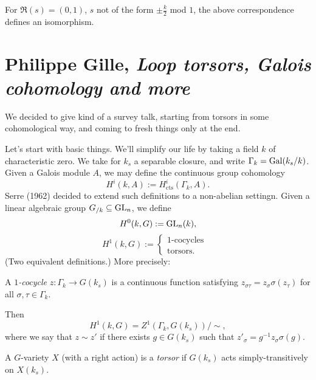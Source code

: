 \documentclass[reqno]{amsart} 
\numberwithin{theorem}{section}
\numberwithin{equation}{section}
\begin{document}
\begin{theorem}[BCP]
  For $\Re(s) =(0, 1)$, $s$ not of the form $\pm \tfrac{k}{2}$ mod $1$, the above correspondence defines an isomorphism.
\end{theorem}

\section{Philippe Gille, \emph{Loop torsors, Galois cohomology and more}}

We decided to give kind of a survey talk, starting from torsors in some cohomological way, and coming to fresh things only at the end.

Let's start with basic things.  We'll simplify our life by taking a field $k$ of characteristic zero.  We take for $k_s$ a separable closure, and write $\Gamma_k = \operatorname{Gal}(k_s / k)$.  Given a Galois module $A$, we may define the continuous group cohomology
\begin{equation*}
  H^i(k, A) := H^i_{\mathrm{cts}}(\Gamma_k, A).
\end{equation*}
Serre (1962) decided to extend such definitions to a non-abelian settingn.  Given a linear algebraic group $G _{/k} \subseteq \operatorname{GL}_n$, we define
\begin{equation*}
  H^0(k, G) := \operatorname{GL}_n(k),
\end{equation*}
\begin{equation*}
  H^1(k, G) :=
  \begin{cases}
    \text{$1$-cocycles}    &  \\
    \text{torsors}.                           & 
  \end{cases}
\end{equation*}
(Two equivalent definitions.)  More precisely:
\begin{definition}
  A $1$\emph{-cocycle} $z : \Gamma_k \rightarrow G(k_s)$ is a continuous function satisfying $z_{\sigma \tau} = z_\sigma \sigma(z_\tau)$ for all $\sigma, \tau \in \Gamma_k$.
\end{definition}
Then
\begin{equation*}
  H^1(k, G) = Z^1(\Gamma_k, G(k_s)) / \sim,
\end{equation*}
where we say that $z \sim z '$ if there exists $g \in G(k_s)$ such that $z '_\sigma = g^{-1} z_\sigma \sigma(g)$.

\begin{definition}
  A $G$-variety $X$ (with a right action) is a \emph{torsor} if $G(k_s)$ acts simply-transitively on $X(k_s)$.
\end{definition}
\end{document}
